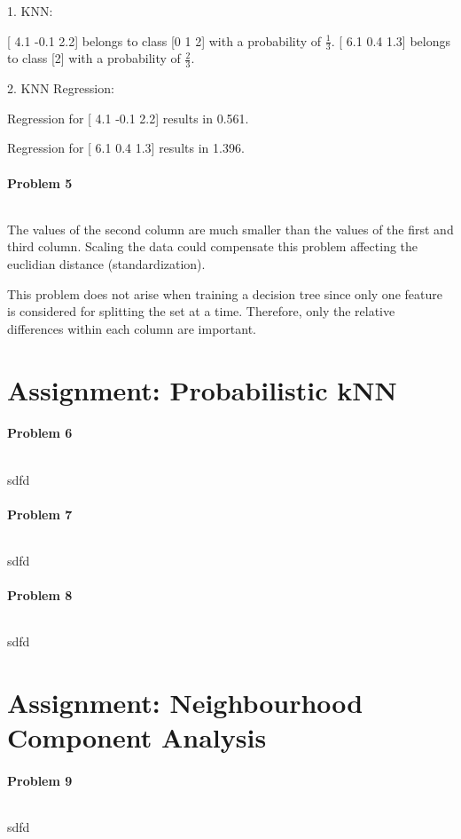 \documentclass{article}
\begin{document}
1. KNN:

[ 4.1 -0.1  2.2] belongs to class [0 1 2] with a probability of $\frac{1}{3}$.
[ 6.1  0.4  1.3] belongs to class [2] with a probability of $\frac{2}{3}$.

2. KNN Regression:

Regression for [ 4.1 -0.1  2.2] results in 0.561.

Regression for [ 6.1  0.4  1.3] results in 1.396.

\paragraph*{Problem 5}
$\;$ 

The values of the second column are much smaller than the values of the first and third column. Scaling the data could compensate this problem affecting the euclidian distance (standardization).

This problem does not arise when training a decision tree since only one feature is considered for splitting the set at a time. Therefore, only the relative differences within each column are important.

\section{Assignment: Probabilistic kNN}
\paragraph*{Problem 6}
$\;$ 

sdfd

\paragraph*{Problem 7}
$\;$ 

sdfd

\paragraph*{Problem 8}
$\;$ 

sdfd

\section{Assignment: Neighbourhood Component Analysis}

\paragraph*{Problem 9}
$\;$ 

sdfd
\end{document}
